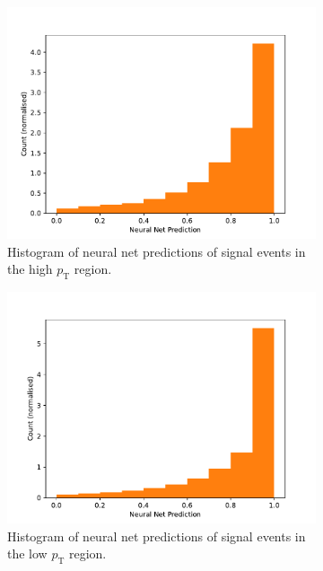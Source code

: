 \documentclass[11pt]{article}
\numberwithin{equation}{section}
\numberwithin{figure}{section}
\numberwithin{table}{section}
\begin{document}
\begin{figure}[h]%
    \centering
    \begin{subfigure}[t]{.49\linewidth}
        \centering
        \includegraphics[width=\linewidth]{Plots/sig_high_pt.pdf}
        \caption{Histogram of neural net predictions of signal events in the high $p_\mathrm{T}$ region.}
        \label{fig:sig_high_pt}
    \end{subfigure}
    \hfill
    \begin{subfigure}[t]{.49\linewidth}
        \centering
        \includegraphics[width=\linewidth]{Plots/sig_low_pt.pdf}
        \caption{Histogram of neural net predictions of signal events in the low $p_\mathrm{T}$ region.}
        \label{fig:sig_low_pt}
    \end{subfigure}
\caption{}
\label{fig:sig_high_low}
\end{figure}
\end{document}
